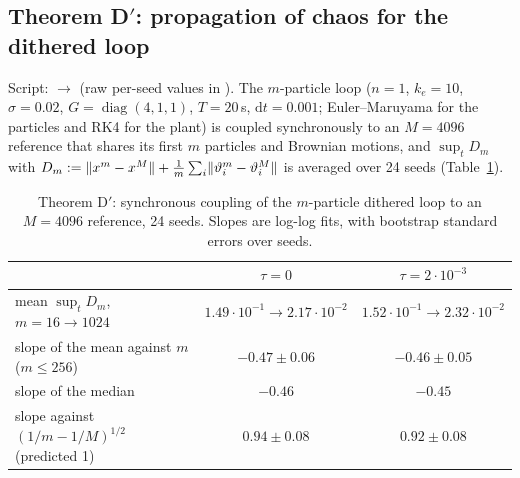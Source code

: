 \subsection{Theorem D\texorpdfstring{$'$}{'}: propagation of chaos for the dithered loop}

Script:  $\to$  (raw per-seed values in ). The $m$-particle loop
($n=1$, $k_e=10$, $\sigma=0.02$, $G=\operatorname{diag}(4,1,1)$, $T=20$\,s, $\mathrm{d}t=0.001$; Euler--Maruyama
for the particles and RK4 for the plant) is coupled synchronously to an $M=4096$ reference that shares its first $m$
particles and Brownian motions, and $\sup_tD_m$ with
$D_m:=\lVert x^m-x^M\rVert+\frac1m\sum_i\lVert \vartheta^m_i-\vartheta^M_i\rVert$ is averaged over 24 seeds
(Table~\ref{tab:evidence:chaos}).

\begin{table}[htbp]
\centering
\small
\caption{Theorem D$'$: synchronous coupling of the $m$-particle dithered loop to an $M=4096$ reference, 24 seeds.
Slopes are log-log fits, with bootstrap standard errors over seeds.}
\label{tab:evidence:chaos}
\begin{tabular}{@{}lcc@{}}
\toprule
 & $\tau=0$ & $\tau=2\cdot10^{-3}$\\
\midrule
mean $\sup_tD_m$, $m=16\to1024$ & $1.49\cdot10^{-1}\to2.17\cdot10^{-2}$ & $1.52\cdot10^{-1}\to2.32\cdot10^{-2}$\\
slope of the mean against $m$ ($m\le256$) & $-0.47\pm0.06$ & $-0.46\pm0.05$\\
slope of the median & $-0.46$ & $-0.45$\\
slope against $(1/m-1/M)^{1/2}$ (predicted 1) & $0.94\pm0.08$ & $0.92\pm0.08$\\
\bottomrule
\end{tabular}
\end{table}

